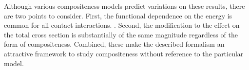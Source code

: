 Although various compositeness models predict variations on these results, there are two points to consider.
First, the functional dependence on the energy \shat is common for all contact interactions. \cite{Eichten:1984eu}.
Second, the modification to the effect on the total cross section is substantially of the same magnitude regardless of the form of compositeness.
Combined, these make the described formalism an attractive framework to study compositeness without reference to the particular model.


